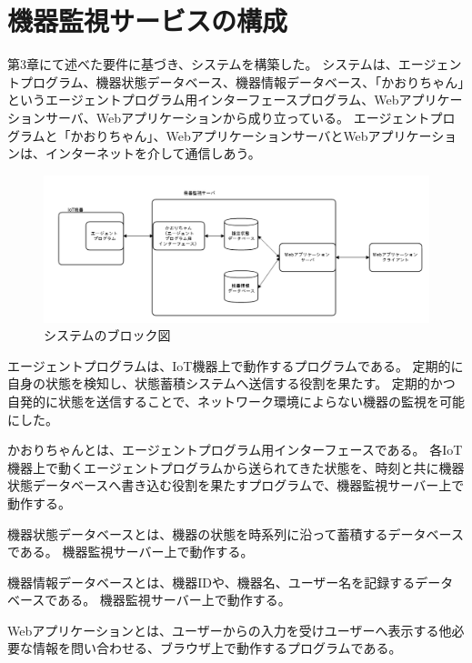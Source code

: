 \section{機器監視サービスの構成}
第3章にて述べた要件に基づき、システムを構築した。
システムは、エージェントプログラム、機器状態データベース、機器情報データベース、「かおりちゃん」というエージェントプログラム用インターフェースプログラム、Webアプリケーションサーバ、Webアプリケーションから成り立っている。
エージェントプログラムと「かおりちゃん」、WebアプリケーションサーバとWebアプリケーションは、インターネットを介して通信しあう。
\medskip

\begin{figure}[htbp]
\includegraphics[width=16cm]{images/blockdiagram2.png}
\caption{システムのブロック図}
\label{fig:blockdiagram}
\end{figure}

エージェントプログラムは、IoT機器上で動作するプログラムである。
定期的に自身の状態を検知し、状態蓄積システムへ送信する役割を果たす。
定期的かつ自発的に状態を送信することで、ネットワーク環境によらない機器の監視を可能にした。
\medskip

かおりちゃんとは、エージェントプログラム用インターフェースである。
各IoT機器上で動くエージェントプログラムから送られてきた状態を、時刻と共に機器状態データベースへ書き込む役割を果たすプログラムで、機器監視サーバー上で動作する。
\medskip

機器状態データベースとは、機器の状態を時系列に沿って蓄積するデータベースである。
機器監視サーバー上で動作する。
\medskip

機器情報データベースとは、機器IDや、機器名、ユーザー名を記録するデータベースである。
機器監視サーバー上で動作する。
\medskip

Webアプリケーションとは、ユーザーからの入力を受けユーザーへ表示する他必要な情報を問い合わせる、ブラウザ上で動作するプログラムである。
\medskip

